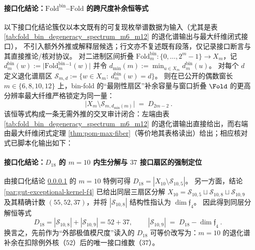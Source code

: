 \paragraph{接口化结论：\texorpdfstring{$\mathrm{Fold}^{\mathrm{bin}}$}{Foldbin}–\texorpdfstring{$\mathrm{Fold}$}{Fold} 的跨尺度补余恒等式}\label{par:gut-foldbin-fold-complement-identity}
以下接口化结论簇仅以本文既有的可复现枚举谱数据为输入（尤其是表 \ref{tab:fold_bin_degeneracy_spectrum_m6_m12} 的退化谱输出与最大纤维闭式接口），
不引入额外外推或解释层候选；行文亦不复述既有段落，仅记录接口断言与其直接推论/核对协议。
对二进制区间折叠 \(\mathrm{Fold}^{\mathrm{bin}}_m:\{0,\dots,2^m-1\}\to X_m\)，记
\(
d^{\mathrm{bin}}_m(w):=\bigl|\mathrm{Fold}^{\mathrm{bin}}_m{}^{-1}(w)\bigr|
\)
并令 \(d_{\min}(m):=\min_{u\in X_m}d^{\mathrm{bin}}_m(u)\)。
对每个 \(d\) 定义退化谱扇区
\(
\mathcal{S}_{m,d}:=\{w\in X_m:\ d^{\mathrm{bin}}_m(w)=d\}
\)。
则在已公开的偶数窗长 \(m\in\{6,8,10,12\}\) 上，bin-fold 的“最刚性扇区”补余容量与窗口折叠 \(\Fold\) 的更高分辨率最大纤维严格锁定为同一量：
\[
\boxed{\ \bigl|X_m\setminus \mathcal{S}_{m,d_{\min}(m)}\bigr|\;=\;D_{2m-2}\ }.
\]
该恒等式构成一条无需外推的交叉审计闭合：左端由表 \ref{tab:fold_bin_degeneracy_spectrum_m6_m12} 的退化谱输出直接给出，而右端由最大纤维闭式定理 \ref{thm:pom-max-fiber}（等价地其表格读出）给出；相应核对式已脚本化输出如下：


\paragraph{接口化结论：\texorpdfstring{$D_{18}$}{D18} 的 \texorpdfstring{$m=10$}{m=10} 内生分解与 \texorpdfstring{$37$}{37} 接口扇区的强制定位}\label{par:gut-d18-endogenous-split}
由接口化结论 \ref{par:gut-foldbin-fold-complement-identity} 的 \(m=10\) 特例可得
\(
D_{18}=|X_{10}\setminus\mathcal{S}_{10,5}|
\)。
另一方面，结论 \ref{par:gut-exceptional-kernel-f4} 已给出同层三扇区分解
\(
X_{10}=\mathcal{S}_{10,5}\sqcup\mathcal{S}_{10,8}\sqcup\mathcal{S}_{10,9}
\)
及其精确计数 \((55,52,37)\)，并将 \(|\mathcal{S}_{10,8}|\) 结构性指认为 \(\dim\mathfrak{f}_4\)。
因此得到同层分解恒等式
\[
D_{18}=|\mathcal{S}_{10,8}|+|\mathcal{S}_{10,9}|=52+37,
\qquad
\boxed{\ |\mathcal{S}_{10,9}|\;=\;D_{18}-\dim\mathfrak{f}_4\ }.
\]
换言之，先前作为“外部极值模尺度”读入的 \(D_{18}\) 可等价改写为：\(m=10\) 的退化谱补余在扣除例外核（\(52\)）后的唯一接口维数（\(37\)）。

